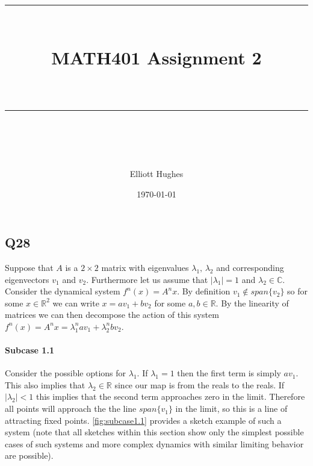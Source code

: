 \documentclass{article}
\title{	
	\normalfont\normalsize 
	\rule{\linewidth}{0.5pt}\\ %
	\vspace{14pt} %
	{\LARGE MATH401 Assignment 2 \\ %
    \large \textit{} \\}
	\vspace{6pt} %
	\rule{\linewidth}{1pt}\\ %
}
\author{Elliott Hughes}
\date{\normalsize\today}
\begin{document}
\maketitle

\subsection*{Q28}
Suppose that $A$ is a $2\times 2$ matrix with eigenvalues $\lambda_1,\, \lambda_2$ and 
corresponding eigenvectors $v_1$ and $v_2$. Furthermore 
let us assume that $|\lambda_1| = 1$ and $\lambda_2 \in \mathbb{C}$. Consider the dynamical 
system $f^n(x) = A^nx$. By definition $v_1 \notin span\{v_2\}$ so for some $x \in \mathbb{R}^2$ 
we can write $x = av_1 + bv_2$ for some $a,b \in \mathbb{R}$. By the linearity of matrices we can 
then decompose the action of this system $f^n(x) = A^nx = \lambda_1^nav_1 + \lambda_2^nbv_2$.

\paragraph{Subcase 1.1}
Consider the possible options for $\lambda_1$. If $\lambda_1 = 1$ then the first term is 
simply $av_1$. This also implies that $\lambda_2 \in \mathbb{R}$ since our map is from the reals to 
the reals. If $|\lambda_2| < 1$ this implies that the second term approaches zero 
in the limit. Therefore all points will approach the the line $span\{v_1\}$ in the limit, 
so this is a line of attracting fixed points. \autoref{fig:subcase1.1} provides a sketch 
example of such a system (note that all sketches within this section show only the simplest 
possible cases of such systems and more complex dynamics with similar limiting behavior are 
possible).
\end{document}

